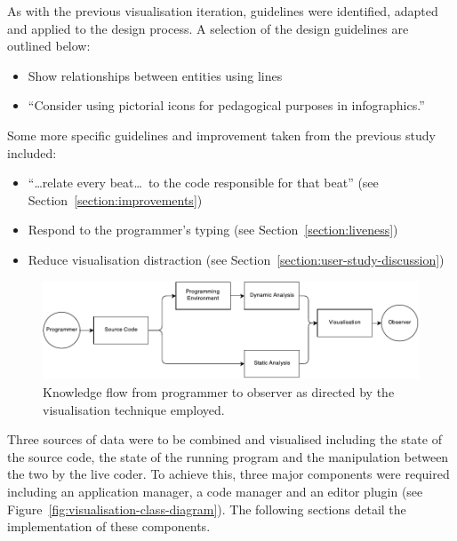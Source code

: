 As with the previous visualisation iteration, guidelines were identified, adapted and applied to the design process. A selection of the design guidelines are outlined below:

\begin{itemize}
\item Show relationships between entities using lines~\cite[p.~183]{Ware2013a} 
\item ``Consider using pictorial icons for pedagogical purposes in infographics.''~\cite[p.~320]{Ware2013a} 
\end{itemize}

Some more specific guidelines and improvement taken from the previous study included:

\begin{itemize}
\item ``\ldots relate every beat\ldots~to the code responsible for that beat'' (see Section~\ref{section:improvements}) 
\item Respond to the programmer's typing (see Section~\ref{section:liveness}) 
\item Reduce visualisation distraction (see Section~\ref{section:user-study-discussion}) 

\end{itemize}



\begin{figure}
  \centering \includegraphics[width=\columnwidth]{../images/diagrams/knowledge-flow-refined.pdf}
  \caption{Knowledge flow from programmer to observer as directed by the visualisation technique employed.}
\label{fig:knowledge-flow-refined}
\end{figure}

Three sources of data were to be combined and visualised including the state of the source code, the state of the running program and the manipulation between the two by the live coder. To achieve this, three major components were required including an application manager, a code manager and an editor plugin (see Figure~\ref{fig:visualisation-class-diagram}). The following sections detail the implementation of these components.

